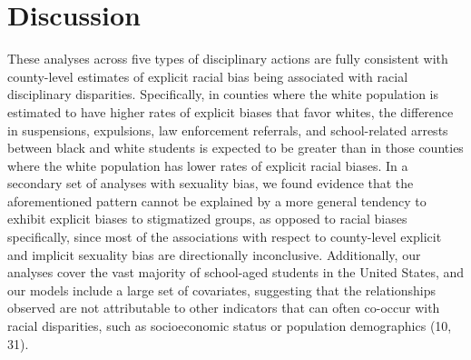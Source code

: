 \documentclass[9pt,twocolumn,twoside,lineno]{pnas-new}
\begin{document}
\section{Discussion}\label{discussion}

These analyses across five types of disciplinary actions are fully
consistent with county-level estimates of explicit racial bias being
associated with racial disciplinary disparities. Specifically, in
counties where the white population is estimated to have higher rates of
explicit biases that favor whites, the difference in suspensions,
expulsions, law enforcement referrals, and school-related arrests
between black and white students is expected to be greater than in those
counties where the white population has lower rates of explicit racial
biases. In a secondary set of analyses with sexuality bias, we found
evidence that the aforementioned pattern cannot be explained by a more
general tendency to exhibit explicit biases to stigmatized groups, as
opposed to racial biases specifically, since most of the associations
with respect to county-level explicit and implicit sexuality bias are
directionally inconclusive. Additionally, our analyses cover the vast
majority of school-aged students in the United States, and our models
include a large set of covariates, suggesting that the relationships
observed are not attributable to other indicators that can often
co-occur with racial disparities, such as socioeconomic status or
population demographics (10, 31).
\end{document}
